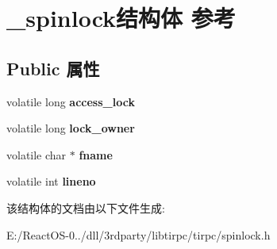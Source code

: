 \hypertarget{struct__spinlock}{}\section{\+\_\+spinlock结构体 参考}
\label{struct__spinlock}
\subsection*{Public 属性}
\begin{DoxyCompactItemize}
\item 
\mbox{\label{struct__spinlock_abb240f622f3e34798ce8f8ad04a07ab4}} 
volatile long {\bfseries access\+\_\+lock}
\item 
\mbox{\label{struct__spinlock_a948c39e992098bda420cb00ef6375b5a}} 
volatile long {\bfseries lock\+\_\+owner}
\item 
\mbox{\label{struct__spinlock_a203161e198d5c7f87e1c50eb1842b99e}} 
volatile char $\ast$ {\bfseries fname}
\item 
\mbox{\label{struct__spinlock_a11fe1690bd300f3d2619d02cb64888a6}} 
volatile int {\bfseries lineno}
\end{DoxyCompactItemize}


该结构体的文档由以下文件生成\+:\begin{DoxyCompactItemize}
\item 
E\+:/\+React\+O\+S-\/0../dll/3rdparty/libtirpc/tirpc/spinlock.\+h\end{DoxyCompactItemize}
